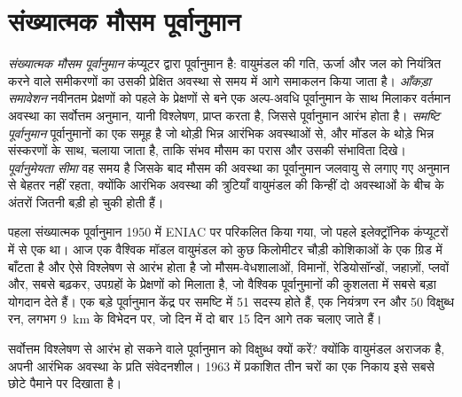 \section{संख्यात्मक मौसम पूर्वानुमान}\label{sec:b2:weather-systems:nwp}

\begin{definition}[संख्यात्मक मौसम पूर्वानुमान; आँकड़ा समावेशन; समष्टि पूर्वानुमान; पूर्वानुमेयता सीमा]\label{def:b2:weather-systems:nwp}
\emph{संख्यात्मक मौसम पूर्वानुमान} कंप्यूटर द्वारा
पूर्वानुमान है: वायुमंडल की गति, ऊर्जा और जल को नियंत्रित करने वाले समीकरणों का उसकी प्रेक्षित अवस्था से
समय में आगे समाकलन किया जाता है। \emph{आँकड़ा समावेशन}
नवीनतम प्रेक्षणों को पहले के प्रेक्षणों से बने एक अल्प-अवधि पूर्वानुमान के साथ मिलाकर
वर्तमान अवस्था का सर्वोत्तम अनुमान, यानी विश्लेषण, प्राप्त करता है, जिससे
पूर्वानुमान आरंभ होता है। \emph{समष्टि पूर्वानुमान} पूर्वानुमानों का एक समूह है जो
थोड़ी भिन्न आरंभिक अवस्थाओं से, और मॉडल के थोड़े भिन्न संस्करणों के साथ, चलाया जाता है, ताकि
संभव मौसम का परास और उसकी संभाविता दिखे। \emph{पूर्वानुमेयता
सीमा} वह समय है जिसके बाद मौसम की अवस्था का पूर्वानुमान
जलवायु से लगाए गए अनुमान से बेहतर नहीं रहता, क्योंकि आरंभिक अवस्था की त्रुटियाँ
वायुमंडल की किन्हीं दो अवस्थाओं के बीच के अंतरों जितनी बड़ी हो चुकी होती हैं।
\end{definition}

पहला संख्यात्मक पूर्वानुमान 1950 में ENIAC पर परिकलित किया गया, जो पहले इलेक्ट्रॉनिक
कंप्यूटरों में से एक था। आज एक वैश्विक मॉडल वायुमंडल को कुछ किलोमीटर चौड़ी कोशिकाओं के एक ग्रिड में बाँटता है
और ऐसे विश्लेषण से आरंभ होता है जो मौसम-वेधशालाओं, विमानों,
रेडियोसॉन्डों, जहाज़ों, प्लवों और, सबसे बढ़कर, उपग्रहों के प्रेक्षणों को मिलाता है, जो वैश्विक पूर्वानुमानों की
कुशलता में सबसे बड़ा योगदान देते हैं। एक बड़े पूर्वानुमान केंद्र पर समष्टि
में 51 सदस्य होते हैं, एक नियंत्रण रन और 50 विक्षुब्ध रन, लगभग \qty{9}{km} के विभेदन पर, जो
दिन में दो बार 15 दिन आगे तक चलाए जाते हैं।

सर्वोत्तम विश्लेषण से आरंभ हो सकने वाले पूर्वानुमान को विक्षुब्ध क्यों करें? क्योंकि वायुमंडल
अराजक है, अपनी आरंभिक अवस्था के प्रति संवेदनशील। 1963 में प्रकाशित तीन चरों का एक निकाय इसे
सबसे छोटे पैमाने पर दिखाता है।

